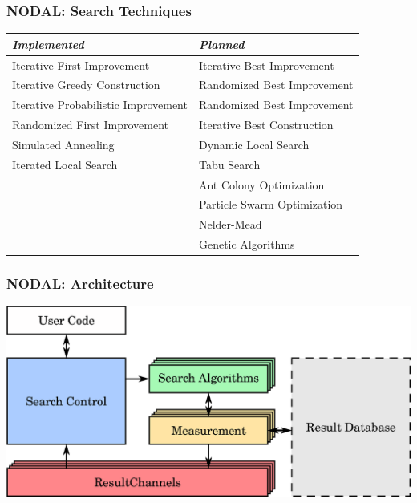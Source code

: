 \documentclass[10pt, compress, aspectratio=169]{beamer}
\begin{document}
\begin{frame}
    \frametitle{NODAL: Search Techniques}
    \begin{table}
        \centering
        \begin{tabular}{@{}p{}p{}@{}}
            \toprule
            \textit{Implemented} & \textit{Planned} \\ \midrule
            Iterative First Improvement & Iterative Best Improvement \\
            Iterative Greedy Construction & Randomized Best Improvement \\
            Iterative Probabilistic Improvement & Randomized Best Improvement \\
            Randomized First Improvement & Iterative Best Construction \\
            Simulated Annealing & Dynamic Local Search \\
            Iterated Local Search & Tabu Search \\
            & Ant Colony Optimization \\
            & Particle Swarm Optimization \\
            & Nelder-Mead \\
            & Genetic Algorithms \\ \bottomrule
        \end{tabular}
    \end{table}
\end{frame}

\begin{frame}
    \frametitle{NODAL: Architecture}
    \begin{center}
        \includegraphics[width=.8\textwidth]{nodal_architecture}
    \end{center}
\end{frame}
\end{document}
